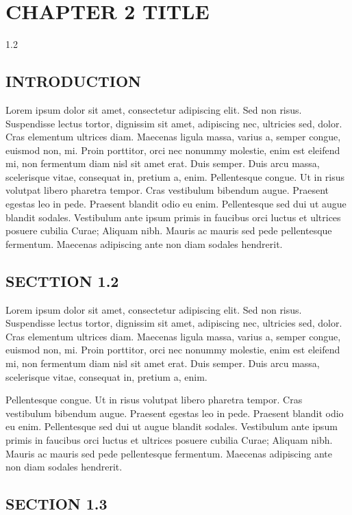 \chapter{CHAPTER 2 TITLE}
\begin{spacing}{1.2}
\minitoc
\thispagestyle{MyStyle}
\end{spacing}
\newpage

\section{INTRODUCTION}
Lorem ipsum dolor sit amet, consectetur adipiscing elit. Sed non risus. Suspendisse lectus tortor, dignissim sit amet, adipiscing nec, ultricies sed, dolor. Cras elementum ultrices diam. Maecenas ligula massa, varius a, semper congue, euismod non, mi. Proin porttitor, orci nec nonummy molestie, enim est eleifend mi, non fermentum diam nisl sit amet erat. Duis semper. Duis arcu massa, scelerisque vitae, consequat in, pretium a, enim. Pellentesque congue. Ut in risus volutpat libero pharetra tempor. Cras vestibulum bibendum augue. Praesent egestas leo in pede. Praesent blandit odio eu enim. Pellentesque sed dui ut augue blandit sodales. Vestibulum ante ipsum primis in faucibus orci luctus et ultrices posuere cubilia Curae; Aliquam nibh. Mauris ac mauris sed pede pellentesque fermentum. Maecenas adipiscing ante non diam sodales hendrerit.
\section{SECTTION 1.2}
Lorem ipsum dolor sit amet, consectetur adipiscing elit. Sed non risus. Suspendisse lectus tortor, dignissim sit amet, adipiscing nec, ultricies sed, dolor. Cras elementum ultrices diam. Maecenas ligula massa, varius a, semper congue, euismod non, mi. Proin porttitor, orci nec nonummy molestie, enim est eleifend mi, non fermentum diam nisl sit amet erat. Duis semper. Duis arcu massa, scelerisque vitae, consequat in, pretium a, enim.\par
Pellentesque congue. Ut in risus volutpat libero pharetra tempor. Cras vestibulum bibendum augue. Praesent egestas leo in pede. Praesent blandit odio eu enim. Pellentesque sed dui ut augue blandit sodales. Vestibulum ante ipsum primis in faucibus orci luctus et ultrices posuere cubilia Curae; Aliquam nibh. Mauris ac mauris sed pede pellentesque fermentum. Maecenas adipiscing ante non diam sodales hendrerit.\par
\section{SECTION 1.3}
